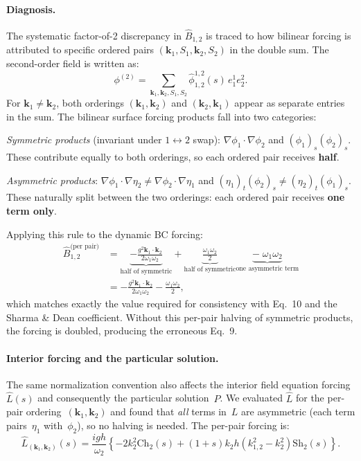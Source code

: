 \documentclass{ol-softwaremanual}
\begin{document}
\paragraph{Diagnosis.} The systematic factor-of-2 discrepancy in $\hat{B}_{1,2}$ is traced to how bilinear forcing is attributed to specific ordered pairs $(\mathbf{k}_1, S_1, \mathbf{k}_2, S_2)$ in the double sum. The second-order field is written as:
\begin{equation}
\phi^{(2)} = \sum_{\mathbf{k}_1,\mathbf{k}_2,S_1,S_2} \hat{\phi}_{1,2}^{1,2}(s)\,e_1^1 e_2^2.
\end{equation}
For $\mathbf{k}_1 \neq \mathbf{k}_2$, both orderings $(\mathbf{k}_1,\mathbf{k}_2)$ and $(\mathbf{k}_2,\mathbf{k}_1)$ appear as separate entries in the sum. The bilinear surface forcing products fall into two categories:

\emph{Symmetric products} (invariant under $1\leftrightarrow 2$ swap): $\nabla\phi_1\cdot\nabla\phi_2$ and $(\phi_1)_s(\phi_2)_s$. These contribute equally to both orderings, so each ordered pair receives \textbf{half}.

\emph{Asymmetric products}: $\nabla\phi_1\cdot\nabla\eta_2 \neq \nabla\phi_2\cdot\nabla\eta_1$ and $(\eta_1)_t(\phi_2)_s \neq (\eta_2)_t(\phi_1)_s$. These naturally split between the two orderings: each ordered pair receives \textbf{one term only}.

Applying this rule to the dynamic BC forcing:
\begin{align}
\hat{B}_{1,2}^{\text{(per pair)}} &= \underbrace{-\frac{g^2\mathbf{k}_1\cdot\mathbf{k}_2}{2\omega_1\omega_2}}_{\text{half of symmetric}}
+ \underbrace{\frac{\omega_1\omega_2}{2}}_{\text{half of symmetric}}
\underbrace{-\;\omega_1\omega_2}_{\text{one asymmetric term}} \nonumber \\
&= -\frac{g^2\mathbf{k}_1\cdot\mathbf{k}_2}{2\omega_1\omega_2} - \frac{\omega_1\omega_2}{2},
\end{align}
which matches exactly the value required for consistency with Eq.~10 and the Sharma \& Dean coefficient. Without this per-pair halving of symmetric products, the forcing is doubled, producing the erroneous Eq.~9.

\paragraph{Interior forcing and the particular solution.}
The same normalization convention also affects the interior field equation forcing $\hat{L}(s)$ and consequently the particular solution~$P$. We evaluated $\hat{L}$ for the per-pair ordering~$(\mathbf{k}_1,\mathbf{k}_2)$ and found that \emph{all} terms in~$L$ are asymmetric (each term pairs~$\eta_1$ with~$\phi_2$), so no halving is needed. The per-pair forcing is:
\begin{equation}
\hat{L}_{(\mathbf{k}_1,\mathbf{k}_2)}(s) = \frac{igh}{\omega_2}\left\{-2k_2^2\mathrm{Ch}_2(s) + (1+s)k_2 h(k_{1,2}^2-k_2^2)\mathrm{Sh}_2(s)\right\}.
\end{equation}
\end{document}
